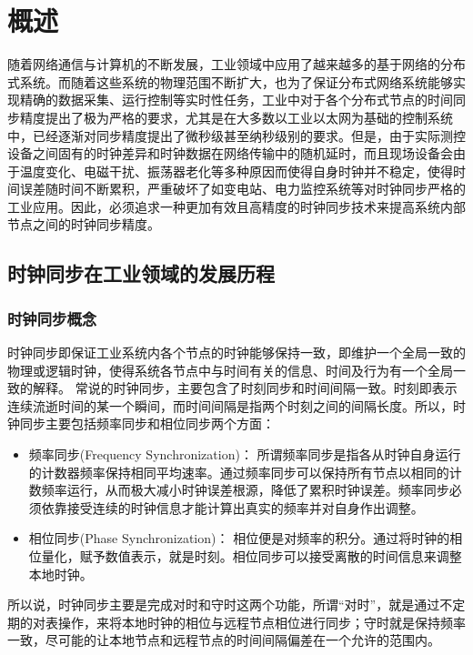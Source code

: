 
\chapter{概述}
\label{chap:intro}
随着网络通信与计算机的不断发展，工业领域中应用了越来越多的基于网络的分布式系统。而随着这些系统的物理范围不断扩大，也为了保证分布式网络系统能够实现精确的数据采集、运行控制等实时性任务，工业中对于各个分布式节点的时间同步精度提出了极为严格的要求，尤其是在大多数以工业以太网为基础的控制系统中，已经逐渐对同步精度提出了微秒级甚至纳秒级别的要求。但是，由于实际测控设备之间固有的时钟差异和时钟数据在网络传输中的随机延时，而且现场设备会由于温度变化、电磁干扰、振荡器老化等多种原因而使得自身时钟并不稳定，使得时间误差随时间不断累积，严重破坏了如变电站、电力监控系统等对时钟同步严格的工业应用。因此，必须追求一种更加有效且高精度的时钟同步技术来提高系统内部节点之间的时钟同步精度。

\section{时钟同步在工业领域的发展历程}
\subsection{时钟同步概念}
\label{sec:concept}
时钟同步即保证工业系统内各个节点的时钟能够保持一致，即维护一个全局一致的物理或逻辑时钟，使得系统各节点中与时间有关的信息、时间及行为有一个全局一致的解释\supercite{1}。
常说的时钟同步，主要包含了时刻同步和时间间隔一致。时刻即表示连续流逝时间的某一个瞬间，而时间间隔是指两个时刻之间的间隔长度。所以，时钟同步主要包括频率同步和相位同步两个方面：
\begin{itemize}[noitemsep,topsep=0pt,parsep=0pt,partopsep=0pt]
	\item 频率同步(Frequency Synchronization)：
		所谓频率同步是指各从时钟自身运行的计数器频率保持相同平均速率。通过频率同步可以保持所有节点以相同的计数频率运行，从而极大减小时钟误差根源，降低了累积时钟误差。频率同步必须依靠接受连续的时钟信息才能计算出真实的频率并对自身作出调整。
	\item 相位同步(Phase Synchronization)：
		相位便是对频率的积分。通过将时钟的相位量化，赋予数值表示，就是时刻。相位同步可以接受离散的时间信息来调整本地时钟。
\end{itemize}

所以说，时钟同步主要是完成对时和守时这两个功能，所谓“对时”，就是通过不定期的对表操作，来将本地时钟的相位与远程节点相位进行同步；守时就是保持频率一致，尽可能的让本地节点和远程节点的时间间隔偏差在一个允许的范围内。

